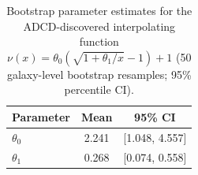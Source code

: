 \begin{table}[H]
\centering\footnotesize
\caption{Bootstrap parameter estimates for the ADCD-discovered interpolating
function $\nu(x) = \theta_0(\sqrt{1+\theta_1/x}-1)+1$ (50 galaxy-level
bootstrap resamples; 95\% percentile CI).}
\label{tab:sparc_bootstrap}
\begin{tabular}{l c c}
\toprule
\textbf{Parameter} & \textbf{Mean} & \textbf{95\% CI} \\
\midrule
  $\theta_{0}$ & 2.241 & [1.048, 4.557] \\
  $\theta_{1}$ & 0.268 & [0.074, 0.558] \\
\bottomrule
\end{tabular}
\end{table}
